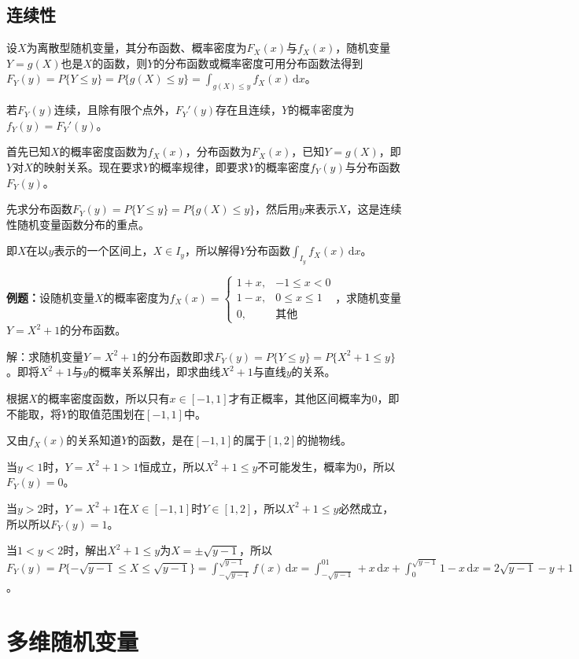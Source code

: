 \documentclass[UTF8, 12pt]{ctexart}
\begin{document}
\subsection{连续性}

设$X$为离散型随机变量，其分布函数、概率密度为$F_X(x)$与$f_X(x)$，随机变量$Y=g(X)$也是$X$的函数，则$Y$的分布函数或概率密度可用分布函数法得到$F_Y(y)=P\{Y\leqslant y\}=P\{g(X)\leqslant y\}=\int_{g(X)\leqslant y}f_X(x)\,\textrm{d}x$。

若$F_Y(y)$连续，且除有限个点外，$F_Y'(y)$存在且连续，$Y$的概率密度为$f_Y(y)=F_Y'(y)$。

首先已知$X$的概率密度函数为$f_X(x)$，分布函数为$F_X(x)$，已知$Y=g(X)$，即$Y$对$X$的映射关系。现在要求$Y$的概率规律，即要求$Y$的概率密度$f_Y(y)$与分布函数$F_Y(y)$。

先求分布函数$F_Y(y)=P\{Y\leqslant y\}=P\{g(X)\leqslant y\}$，然后用$y$来表示$X$，这是连续性随机变量函数分布的重点。

即$X$在以$y$表示的一个区间上，$X\in I_y$，所以解得$Y$分布函数$\int_{I_y}f_X(x)\,\textrm{d}x$。

\textbf{例题：}设随机变量$X$的概率密度为$f_X(x)=\left\{\begin{array}{ll}
    1+x, & -1\leqslant x<0 \\
    1-x, & 0\leqslant x\leqslant1 \\
    0, & \text{其他}
\end{array}\right.$，求随机变量$Y=X^2+1$的分布函数。

解：求随机变量$Y=X^2+1$的分布函数即求$F_Y(y)=P\{Y\leqslant y\}=P\{X^2+1\leqslant y\}$。即将$X^2+1$与$y$的概率关系解出，即求曲线$X^2+1$与直线$y$的关系。

根据$X$的概率密度函数，所以只有$x\in [-1,1]$才有正概率，其他区间概率为0，即不能取，将$Y$的取值范围划在$[-1,1]$中。

又由$f_X(x)$的关系知道$Y$的函数，是在$[-1,1]$的属于$[1,2]$的抛物线。

当$y<1$时，$Y=X^2+1>1$恒成立，所以$X^2+1\leqslant y$不可能发生，概率为0，所以$F_Y(y)=0$。

当$y>2$时，$Y=X^2+1$在$X\in[-1,1]$时$Y\in[1,2]$，所以$X^2+1\leqslant y$必然成立，所以所以$F_Y(y)=1$。

当$1<y<2$时，解出$X^2+1\leqslant y$为$X=\pm\sqrt{y-1}$，所以$F_Y(y)=P\{-\sqrt{y-1}\leqslant X\leqslant\sqrt{y-1}\}=\int_{-\sqrt{y-1}}^{\sqrt{y-1}}f(x)\,\textrm{d}x=\int_{-\sqrt{y-1}}^01+x\,\textrm{d}x+\int_0^{\sqrt{y-1}}1-x\,\textrm{d}x=2\sqrt{y-1}-y+1$。

\section{多维随机变量}
\end{document}
